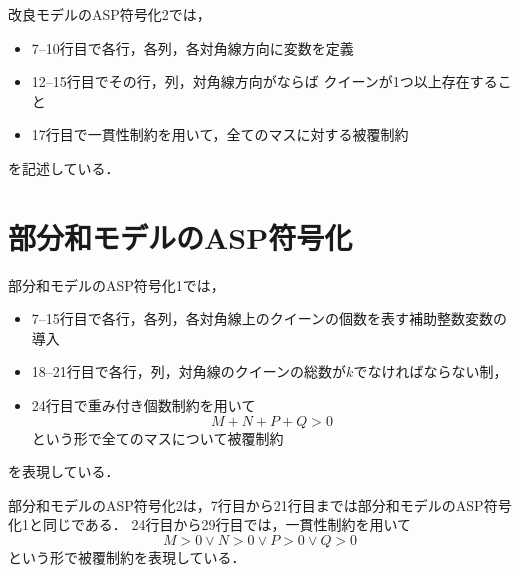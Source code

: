 \newpage
改良モデルのASP符号化2では，
\begin{itemize}
 \item 7--10行目で各行，各列，各対角線方向に変数を定義
 \item 12--15行目でその行，列，対角線方向がならば
  クイーンが1つ以上存在すること
 \item 17行目で一貫性制約を用いて，全てのマスに対する被覆制約
\end{itemize}
を記述している．

\newpage
\section{部分和モデルのASP符号化}



部分和モデルのASP符号化1では，
\begin{itemize}
 \item 7--15行目で各行，各列，各対角線上のクイーンの個数を表す補助整数変数の導入
 \item 18--21行目で各行，列，対角線のクイーンの総数が$k$でなければならない制， 
 \item 24行目で重み付き個数制約を用いて
	$$M+N+P+Q>0$$
  という形で全てのマスについて被覆制約
\end{itemize}
を表現している．

\newpage


部分和モデルのASP符号化2は，7行目から21行目までは部分和モデルのASP符号化1と同じである．
24行目から29行目では，一貫性制約を用いて
$$M>0 \vee N>0 \vee P>0 \vee Q>0$$
という形で被覆制約を表現している．

